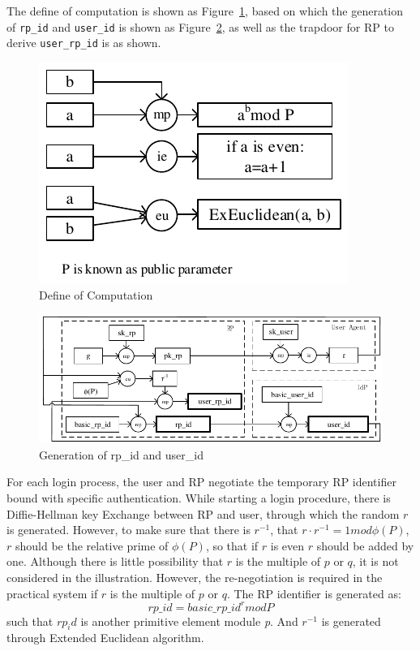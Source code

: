 The define of computation is shown as Figure~\ref{fig:define}, based on which the generation of \verb+rp_id+ and \verb+user_id+ is shown as Figure~\ref{fig:generating}, as well as the trapdoor for RP to derive \verb+user_rp_id+ is as shown.
\begin{figure}
  \centering
  \includegraphics[width=\linewidth]{fig/computationdefine.pdf}
  \caption{Define of Computation}
  \label{fig:define}
\end{figure}

\begin{figure}
  \centering
  \includegraphics[width=0.8\linewidth]{fig/generating2.pdf}
  \caption{Generation of rp\_id and user\_id}
  \label{fig:generating}
\end{figure}

For each login process, the user and RP negotiate the temporary RP identifier bound with specific authentication.
While starting a login procedure, there is Diffie-Hellman key Exchange\cite{DiffieH76} between RP and user, through which the random $r$ is generated. However, to make sure that there is $r^{-1}$, that $r\cdot r^{-1}=1 mod \phi(P)$, $r$ should be the relative prime of $\phi(P)$, so that if $r$ is even $r$ should be added by one. Although there is little possibility that $r$ is the multiple of $p$ or $q$, it is not considered in the illustration. However, the re-negotiation is required in the practical system if $r$ is the multiple of $p$ or $q$. The RP identifier is generated as: 
$$rp\_id=basic\_rp\_id^r mod P$$
such that $rp_id$ is another primitive element module \emph{p}. And $r^{-1}$ is generated through Extended Euclidean algorithm.

